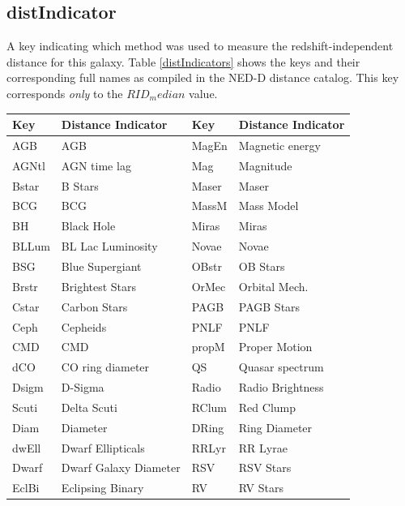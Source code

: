 \documentclass[iop]{emulateapj-rtx4}
\begin{document}
\subsection{distIndicator}
A key indicating which method was used to measure the redshift-independent distance for this galaxy. Table \ref{distIndicators} shows the keys and their corresponding full names as compiled in the NED-D distance catalog. This key corresponds \textit{only} to the $RID_median$ value.

\begin{table}[ht]\footnotesize
\begin{center}
\begin{tabular}{l l | l l}
 \hline \hline
    Key       &	Distance Indicator		&	Key		&	Distance Indicator 	\\
  \hline \hline 
    AGB	&	AGB					&	MagEn    	&	Magnetic energy    	\\
    AGNtl	&	AGN time lag    		&	Mag    	&	Magnitude    	\\
    Bstar	&	B Stars				&	Maser    	&	Maser    	\\
    BCG	&	BCG					&	MassM    	&	Mass Model    	\\
    BH	&	Black Hole			&	Miras   	&	Miras    	\\
    BLLum	&	BL Lac Luminosity		&	Novae    	&	Novae    	\\
    BSG    	&	Blue Supergiant		&	OBstr    	&	OB Stars    	\\
    Brstr    	&	Brightest Stars    		&	OrMec    	&	Orbital Mech.    	\\
    Cstar    	&	Carbon Stars    			&	PAGB    	&	PAGB Stars    	\\
    Ceph    	&	Cepheids				&	PNLF    	&	PNLF    	\\
    CMD    	&	CMD					&	propM    	&	Proper Motion    	\\
    dCO    	&	CO ring diameter		&	QS    	&	Quasar spectrum    	\\
    Dsigm	&	D-Sigma				&	Radio    	&	Radio Brightness    	\\
    Scuti	&	Delta Scuti    			&	RClum    	&	Red Clump    	\\
    Diam	&	Diameter				&	DRing    	&	Ring Diameter    	\\
    dwEll	&	Dwarf Ellipticals    		&	RRLyr    	&	RR Lyrae    	\\
    Dwarf	&	Dwarf Galaxy Diameter	&	RSV    	&	RSV Stars    	\\
    EclBi	&	Eclipsing Binary		&	RV    	&	RV Stars    	\\

\end{tabular}
\end{center}
\end{table}
\end{document}
